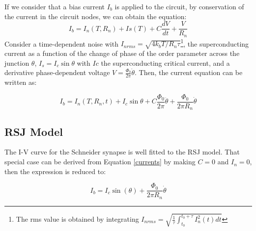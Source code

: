 \documentclass[12pt]{article}
\begin{document}
If we consider that a bias current $I_{b}$ is applied to the circuit, by conservation of the current in the circuit nodes, we can obtain the equation:
$$
	I_{b} = I_{n}(T,R_{n}) + Is(T) + C\frac{dV}{dt} + \frac{V}{R_{n}}
$$
Consider a time-dependent noise with $I_{nrms} = \sqrt{4k_{b}T / R_{n}\tau}$\footnote{The rms value is obtained by integrating $I_{nrms} = \sqrt{\frac{1}{\tau}\int_{t_{0}}^{t_{0}+\tau} I_{n}^{2}(t) dt}$}, the superconducting current as a function of the change of phase of the order parameter across the junction $\theta$, $I_{s} = I_{c} \sin{\theta}$ with $Ic$ the superconducting critical current, and a derivative phase-dependent voltage $V = \frac{\Phi_{0}}{2\pi}\dot{\theta}$. Then, the current equation can be written as:

\begin{equation}
I_{b} = I_{n}(T,R_{n}, t) + I_{c}\sin{\theta} + C\frac{\Phi_{0}}{2\pi}\ddot{\theta} + \frac{\Phi_{0}}{2\pi R_{n}}\dot{\theta}
\end{equation}
\label{currents}


\subsection{RSJ Model}
The I-V curve for the Schneider synapse is well fitted to the RSJ model. That special case can be derived from Equation \ref{currents} by making $C=0$ and $I_{n}=0$, then the expression is reduced to:

\begin{equation}
I_{b} =  I_{c}\sin(\theta) + \frac{\Phi_{0}}{2\pi R_{n}}\dot{\theta}
\end{equation}
\label{rsj}
\end{document}
